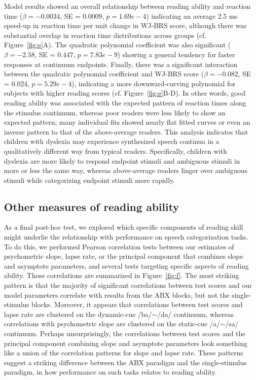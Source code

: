 \documentclass[../uwthesis.tex]{subfiles}
\begin{document}
Model results showed an overall relationship between reading ability and reaction time ($\beta = −0.0034$, SE = 0.0009, $p = 1.69e-4$) indicating an average 2.5 ms speed-up in reaction time per unit change in WJ-BRS score, although there was substantial overlap in reaction time distributions across groups (cf. Figure~\ref{fig:e}A). The quadratic polynomial coefficient was also significant ($\beta = −2.58$, SE = 0.447, $p = 7.83e-9$) showing a general tendency for faster responses at continuum endpoints. Finally, there was a significant interaction between the quadratic polynomial coefficient and WJ-BRS score ($\beta = −0.082$, SE = 0.024, $p = 5.29e-4$), indicating a more downward-curving polynomial for subjects with higher reading scores (cf. Figure~\ref{fig:e}B-D). In other words, good reading ability was associated with the expected pattern of reaction times along the stimulus continuum, whereas poor readers were less likely to show an expected pattern; many individual fits showed nearly flat fitted curves or even an inverse pattern to that of the above-average readers. This analysis indicates that children with dyslexia may experience synthesized speech continua in a qualitatively different way from typical readers. Specifically, children with dyslexia are more likely to respond endpoint stimuli and ambiguous stimuli in more or less the same way, whereas above-average readers linger over ambiguous stimuli while categorizing endpoint stimuli more rapidly.

\subsection{Other measures of reading ability}
As a final post-hoc test, we explored which specific components of reading skill might underlie the relationship with performance on speech categorization tasks. To do this, we performed Pearson correlation tests between our estimates of psychometric slope, lapse rate, or the principal component that combines slope and asymptote parameters, and several tests targeting specific aspects of reading ability. Those correlations are summarized in Figure~\ref{fig:f}. The most striking pattern is that the majority of significant correlations between test scores and our model parameters correlate with results from the ABX blocks, but not the single-stimulus blocks. Moreover, it appears that correlations between test scores and lapse rate are clustered on the dynamic-cue /ba/$\sim$/da/ continuum, whereas correlations with psychometric slope are clustered on the static-cue /a/$\sim$/sa/ continuum. Perhaps unsurprisingly, the correlations between test scores and the principal component combining slope and asymptote parameters look something like a union of the correlation patterns for slope and lapse rate.  These patterns suggest a striking difference between the ABX paradigm and the single-stimulus paradigm, in how performance on such tasks relates to reading ability.
\end{document}
